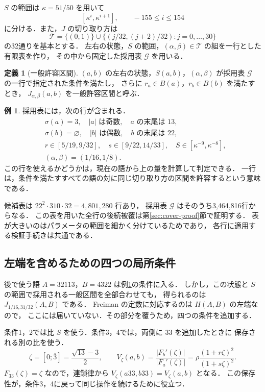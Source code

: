 \documentclass[11pt,a4paper]{article}
\theoremstyle{definition}
\newtheorem{definition}{定義}
\newtheorem{example}{例}
\newcommand{\eps}{\varnothing}
\newcommand{\G}{\mathcal G}
\begin{document}
$S$ の範囲は $\kappa=51/50$ を用いて
\[
 [\kappa^i,\kappa^{i+1}],\qquad -155\le i\le154
\]
に分ける．また，$J$ の切り取り方は
\[
 \mathcal T=\{(0,1)\}\cup
 \{(j/32,(j+2)/32):j=0,\ldots,30\}
\]
の32通りを基本とする．
左右の状態，$S$ の範囲，$(\alpha,\beta)\in\mathcal T$ の組を一行とした有限表を作り，
その中から固定した採用表 $\G$ を用いる．

\begin{definition}[一般許容区間]\label{def:general}
$(a,b)$ の左右の状態，$S(a,b)$，$(\alpha,\beta)$ が採用表 $\G$ の一行で指定された条件を満たし，
さらに $r_a\in B(a)$，$r_b\in B(b)$ を満たすとき，
$J_{\alpha,\beta}(a,b)$ を一般許容区間と呼ぶ．
\end{definition}

\begin{example}\label{ex:general-row}
採用表には，次の行が含まれる．
\[
\begin{aligned}
 &\sigma(a)=3,\quad |a|\text{ は奇数},\quad a\text{ の末尾は }13,\\
 &\sigma(b)=\eps,\quad |b|\text{ は偶数},\quad b\text{ の末尾は }22,\\
 &r\in[5/19,9/32],\quad s\in[9/22,14/33],\quad
 S\in[\kappa^{-9},\kappa^{-8}],\\
 &(\alpha,\beta)=(1/16,1/8).
\end{aligned}
\]
この行を使えるかどうかは，現在の語から上の量を計算して判定できる．
一行は，条件を満たすすべての語の対に同じ切り取り方の区間を許容するという意味である．
\end{example}

候補表は $22^2\cdot310\cdot32=4,801,280$ 行あり，
採用表 $\G$ はそのうち3,464,816行からなる．
この表を用いた全行の後続被覆は第\ref{sec:cover-proof}節で証明する．
表が大きいのはパラメータの範囲を細かく分けているためであり，
各行に適用する検証手続きは共通である．

\subsection{左端を含めるための四つの局所条件}
後で使う語 $A=32113$，$B=4322$ は例\ref{ex:general-row}の条件に入る．
しかし，この状態と $S$ の範囲で採用される一般区間を全部合わせても，
得られるのは $J_{1/16,31/32}(A,B)$ である．
Freiman の定数に対応するのは $H(A,B)$ の左端なので，
ここには届いていない．その部分を覆うため，四つの条件を追加する．

条件1，2では比 $S$ を使う．条件3，4では，両側に $33$ を追加したときに
保存される別の比を使う．
\[
 \zeta=[0;\overline3]=\frac{\sqrt{13}-3}{2},\qquad
 V_\zeta(a,b)=\frac{|F_b'(\zeta)|}{|F_a'(\zeta)|}
            =\rho\frac{(1+r\zeta)^2}{(1+s\zeta)^2}.
\]
$F_{33}(\zeta)=\zeta$ なので，連鎖律から
$V_\zeta(a33,b33)=V_\zeta(a,b)$ となる．
この保存性が，条件3，4に戻って同じ操作を続けるために役立つ．
\end{document}
